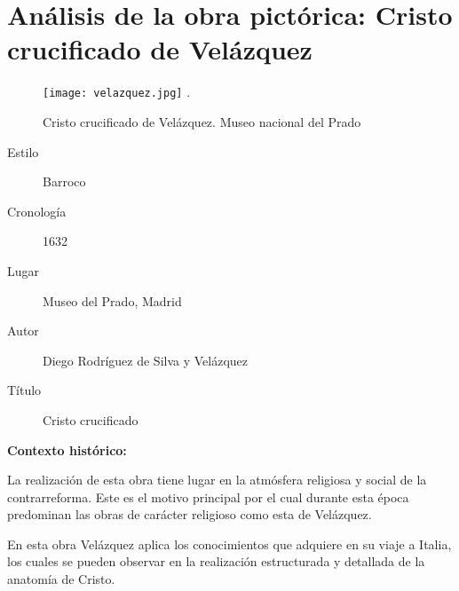 \section{Análisis de la obra pictórica: Cristo crucificado de Velázquez } 

\begin{figure}[ht!]
    \centering
    \texttt{[image: velazquez.jpg]}
   .\caption{Cristo crucificado de Velázquez. Museo nacional del Prado} %
\end{figure}

\newpage



\begin{description}
\item[Estilo] Barroco
\item[Cronología] 1632
\item[Lugar] Museo del Prado, Madrid
\item[Autor] Diego Rodríguez de Silva y Velázquez
\item[Título] Cristo crucificado
\end{description}

\textbf{Contexto histórico:}

La realización de esta obra tiene lugar en la atmósfera religiosa y social de la contrarreforma. Este es el motivo principal por el cual durante esta época predominan las obras de carácter religioso como esta de Velázquez.

En esta obra Velázquez aplica los conocimientos que adquiere en su viaje a Italia, los cuales se pueden observar en la realización estructurada y detallada de la anatomía de Cristo.

